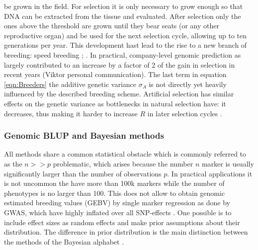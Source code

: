 be grown in the field. For selection it is only necessary to grow enough so that DNA can be extracted from the
tissue and evaluated. After selection only the ones above the threshold are grown until they bear seats (or
any other reproductive organ) and be used for the next selection cycle, allowing up to ten generations per
year. This development hast lead to the rise to a new branch of breeding: speed breeding
\cite{ghosh2018speed}; \cite{watson2018speed}.  In practical, company-level genomic prediction as largely
contributed to an increase by a factor of 2 of the gain in selection in recent years (Viktor personal
communication).\newline
The last term in equation \ref{eqn:Breeders} the additive genetic variance $\sigma_A$ is not directly yet heavily influenced by the described breeding scheme. Artificial selection has similar effects on the genetic variance as bottlenecks in natural selection have: it decreases, thus making it harder to increase $R$ in later selection cycles \cite{walsh2018}.


\subsubsection{Genomic BLUP and Bayesian methods}\label{blup:bayes}

All methods share a common statistical obstacle which is commonly referred to as the $n >> p$ problematic,
which arises because the number $n$ marker is usually significantly larger than the number of observations
$p$. In practical applications it is not uncommon the have more than 100k markers while the number of
phenotypes is no larger than 100. This does not allow to obtain genomic estimated breeding values (GEBV) by
single marker regression as done by GWAS, which have highly inflated over all SNP-effects
\cite{korte2013advantages}. One possible is to include effect sizes as random effects and make prior
assumptions about their distribution. The difference in prior distribution is the main distinction between the
methods of the Bayesian alphabet
\cite{gianola2013}.\\

